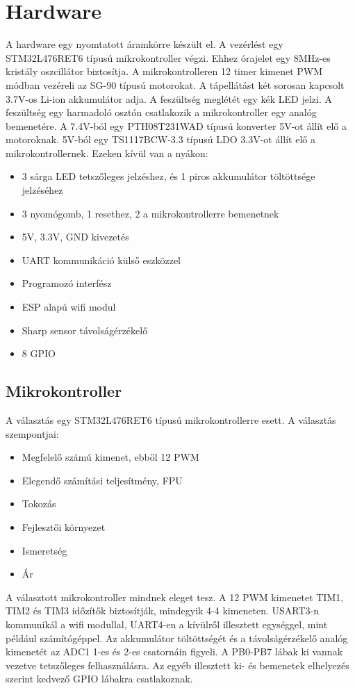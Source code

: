 \documentclass{article}
\begin{document}
\section{Hardware}
A hardware egy nyomtatott áramkörre készült el. A vezérlést egy STM32L476RET6 típusú mikrokontroller végzi. Ehhez órajelet egy 8MHz-es kristály oszcillátor biztosítja. A mikrokontrolleren 12 timer kimenet PWM módban vezéreli az SG-90 típusú motorokat. A tápellátást két sorosan kapcsolt 3.7V-os Li-ion akkumulátor adja. A feszültség meglétét egy kék LED jelzi. A feszültség egy harmadoló osztón csatlakozik a mikrokontroller egy analóg bemenetére. A 7.4V-ból egy PTH08T231WAD típusú konverter 5V-ot állít elő a motoroknak. 5V-ból egy TS1117BCW-3.3 típusú LDO 3.3V-ot állít elő a mikrokontrollernek.
Ezeken kívül van a nyákon:
\begin{itemize}
\item 3 sárga LED tetszőleges jelzéshez, és 1 piros akkumulátor töltöttsége jelzéséhez
\item 3 nyomógomb, 1 resethez, 2 a mikrokontrollerre bemenetnek
\item 5V, 3.3V, GND kivezetés
\item UART kommunikáció külső eszközzel
\item Programozó interfész
\item ESP alapú wifi modul
\item Sharp sensor távolságérzékelő
\item 8 GPIO
\end{itemize}
\subsection{Mikrokontroller}
A választás egy STM32L476RET6 típusú mikrokontrollerre esett. A választás szempontjai:
\begin{itemize}
\item Megfelelő számú kimenet, ebből 12 PWM
\item Elegendő számítási teljesítmény, FPU 
\item Tokozás
\item Fejlesztői környezet
\item Ismeretség
\item Ár
\end{itemize}
A választott mikrokontroller mindnek eleget tesz. A 12 PWM kimenetet TIM1, TIM2 és TIM3 időzítők biztosítják, mindegyik 4-4 kimeneten. USART3-n kommunikál a wifi modullal, UART4-en a kívülről illesztett egységgel, mint például számítógéppel. Az akkumulátor töltöttségét és a távolságérzékelő analóg kimenetét az ADC1 1-es és 2-es csatornáin figyeli. A PB0-PB7 lábak ki vannak vezetve tetszőleges felhasználásra. Az egyéb illesztett ki- és bemenetek elhelyezés szerint kedvező GPIO lábakra csatlakoznak.
\end{document}
